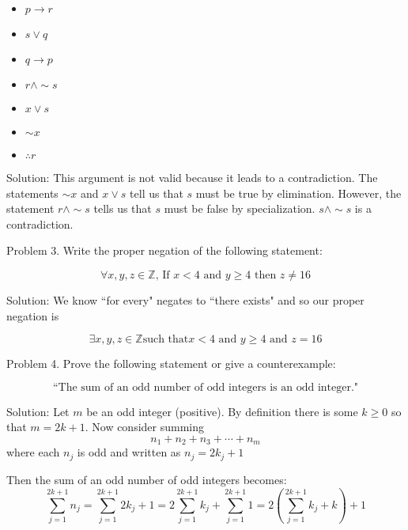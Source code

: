 \documentclass[16 pt]{amsart}
\theoremstyle{definition}
\theoremstyle{remark}
\numberwithin{equation}{subsection}
\newcommand{\Z}{\mathbb{Z}}
\begin{document}
\begin{itemize}
\item[] $p\rightarrow r$\\
\item[] $s \vee q$\\
\item[] $q \rightarrow p $\\
\item[] $r \wedge \sim s$\\
\item[] $x \vee s$\\
\item[] $\sim x$\\
\item[] $\therefore r$
\end{itemize}

\vspace{1in}

Solution: This argument is not valid because it leads to a contradiction.  The statements $\sim x$ and $x\vee s$ tell us that $s$ must be true by elimination.  However, the statement $r\wedge \sim s$ tells us that $s$ must be false by specialization.  $s\wedge \sim s$ is a contradiction.


\newpage

Problem 3. Write the proper negation of the following statement:

\[
\forall x,y,z\in\Z \text{, If } x < 4 \text{ and } y\ge 4 \text{ then } z \ne 16
\]

\vspace{1in}

Solution: We know ``for every" negates to ``there exists" and so our proper negation is

\[
\exists x,y,z\in\Z \text{such that} x < 4 \text{ and } y\ge 4 \text{ and } z = 16
\]

\newpage

Problem 4. Prove the following statement or give a counterexample:

\[
\text{``The sum of an odd number of odd integers is an odd integer."}
\]

\vspace{1in}

Solution: Let $m$ be an odd integer (positive).  By definition there is some $k\ge 0$ so that $m=2k+1$.  Now consider summing 
\[
n_1 + n_2 + n_3 + \cdots + n_m
\] 
where each $n_j$ is odd and written as $n_j = 2k_j + 1$

Then the sum of an odd number of odd integers becomes:
\[
\sum_{j=1}^{2k+1} n_j = \sum_{j=1}^{2k+1} 2k_j +1 = 2\sum_{j=1}^{2k+1} k_j + \sum_{j=1}^{2k+1} 1 = 2\left(\sum_{j=1}^{2k+1} k_j +  k\right) +1
\]
\end{document}
